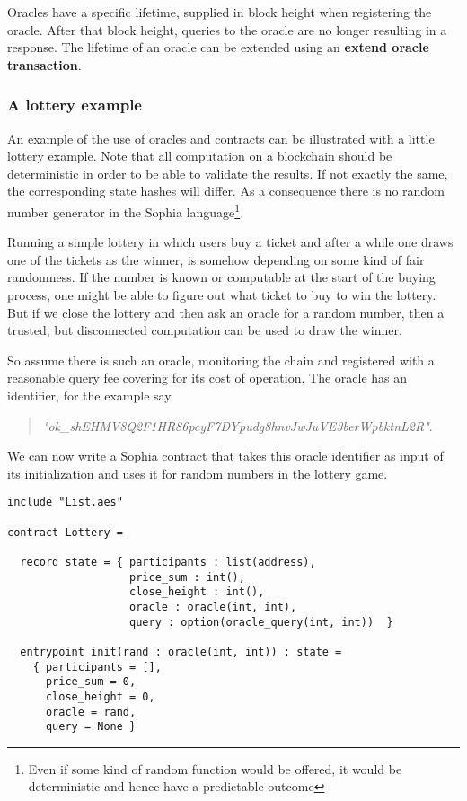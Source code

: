 Oracles have a specific lifetime, supplied in block height when
registering the oracle. After that block height, queries to the oracle
are no longer resulting in a response. The lifetime of an oracle can
be extended using an \textbf{extend oracle transaction}.


\subsubsection{A lottery example}

An example of the use of oracles and contracts can be illustrated with
a little lottery example. Note that all computation on a blockchain
should be deterministic in order to be able to validate the
results. If not exactly the same, the corresponding state hashes will
differ. As a consequence there is no random number generator in the
Sophia language\footnote{Even if some kind of random function would be
  offered, it would be deterministic and hence have a predictable
  outcome}.

Running a simple lottery in which users buy a ticket and after a while
one draws one of the tickets as the winner, is somehow depending on
some kind of fair randomness. If the number is known or computable at
the start of the buying process, one might be able to figure out what
ticket to buy to win the lottery. But if we close the lottery and then
ask an oracle for a random number, then a trusted, but disconnected
computation can be used to draw the winner.

So assume there is such an oracle, monitoring the chain and registered
with a reasonable query fee covering for its cost of operation. The
oracle has an identifier, for the example say
\begin{quote}
  \textit{"ok\_shEHMV8Q2F1HR86pcyF7DYpudg8hnvJwJuVE3berWpbktnL2R"}.
\end{quote}
We can now write a Sophia contract that takes this oracle identifier
as input of its initialization and uses it for random numbers in the
lottery game.

\begin{verbatim}
include "List.aes"

contract Lottery =

  record state = { participants : list(address),
                   price_sum : int(),
                   close_height : int(),
                   oracle : oracle(int, int),
                   query : option(oracle_query(int, int))  }

  entrypoint init(rand : oracle(int, int)) : state =
    { participants = [],
      price_sum = 0,
      close_height = 0,
      oracle = rand,
      query = None }
\end{verbatim}

